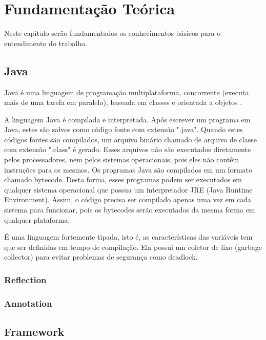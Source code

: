 \chapter{Fundamentação Teórica}
\label{ch:fundamentacao}
\par Neste capítulo ser\~ao fundamentados os conhecimentos b\'asicos para o entendimento do trabalho.


\section{Java}

\par Java é uma linguagem de programação multiplataforma, concorrente (executa mais de uma tarefa em paralelo), baseada em classes e orientada a objetos \cite{joy2000java}.
\par A linguagem Java é compilada e interpretada. Após escrever um programa em Java, estes são salvos como código fonte com extensão ".java". Quando estes códigos fontes são compilados, um arquivo binário chamado de arquivo de classe com extensão ".class" é gerado. Esses arquivos não são executados diretamente pelos processadores, nem pelos sistemas operacionais, pois eles não contêm instruções para os mesmos. Os programas Java são compilados em um formato chamado bytecode. Desta forma, esses programas podem ser executados em qualquer sistema operacional que possua um interpretador JRE (Java Runtime Environment). Assim, o código precisa ser compilado apenas uma vez em cada sistema para funcionar, pois os bytecodes serão executados da mesma forma em qualquer plataforma\cite{indrusiak1996linguagem}.
\par É uma linguagem fortemente tipada, isto é, as características das variáveis tem que ser definidas em tempo de compilação. Ela possui um coletor de lixo (garbage collector) para evitar problemas de segurança como deadlock. \cite{joy2000java}

\subsection{Reflection}

\subsection{Annotation}

\section{Framework}

